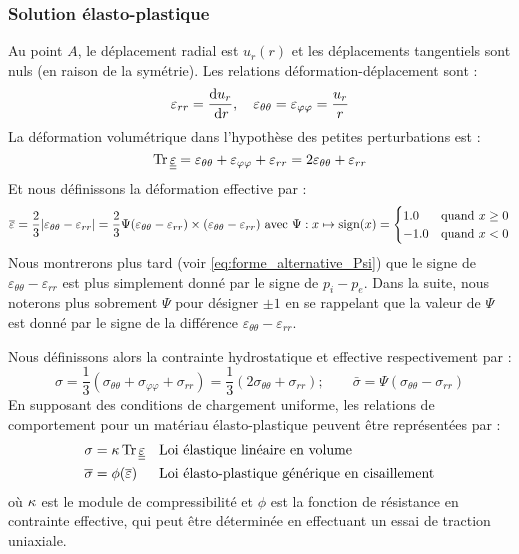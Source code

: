 \documentclass[10pt]{book}
\begin{document}
\subsubsection{Solution élasto-plastique}
Au point $A$, le déplacement radial est $u_{r}(r)$ et les déplacements tangentiels sont nuls (en raison de la symétrie). Les relations déformation-déplacement sont :
\begin{equation}
\varepsilon_{rr} = \frac{\mathrm{d} u_{r}}{\,\mathrm{d}r}, \quad \varepsilon_{\theta\theta} = \varepsilon_{\varphi\varphi} = \frac{u_{r}}{r}
\label{eq:Vaziri_defi_defo_sph}
\end{equation}
La déformation volumétrique dans l'hypothèse des petites perturbations est :
\begin{equation}
\tr\DefoHPP = \varepsilon_{\theta\theta} + \varepsilon_{\varphi\varphi} + \varepsilon_{rr} = 2\varepsilon_{\theta\theta} + \varepsilon_{rr}
\label{eq:Vaziri_defi_defo_vol}
\end{equation}
Et nous définissons la déformation effective par :
\begin{equation}
\overline{\varepsilon} = \frac{2}{3}|\varepsilon_{\theta\theta} - \varepsilon_{rr}| = \frac{2}{3}\Psi(\varepsilon_{\theta\theta} - \varepsilon_{rr}) \times (\varepsilon_{\theta\theta} - \varepsilon_{rr}) \text{ avec } \Psi:x\mapsto\mbox{sign}(x)= \begin{cases}
1.0 & \text{quand } x \geq 0\\
-1.0 & \text{quand } x < 0
\end{cases}
\label{eq:Vaziri_defi_defo_eff}
\end{equation}
Nous montrerons plus tard  (voir \eqref{eq:forme_alternative_Psi}) que le signe de $\varepsilon_{\theta\theta} - \varepsilon_{rr}$ est plus simplement donné par le signe de $p_{i}-p_{e}$. Dans la suite, nous noterons plus sobrement $\Psi$ pour désigner $\pm 1$ en se rappelant que la valeur de $\Psi$ est donné par le signe de la différence $\varepsilon_{\theta\theta} - \varepsilon_{rr}$.

Nous définissons alors la contrainte hydrostatique et effective respectivement par :
\begin{equation}
\sigma = \frac{1}{3}(\sigma_{\theta\theta} + \sigma_{\varphi\varphi} + \sigma_{rr}) = \frac{1}{3}(2\sigma_{\theta\theta} + \sigma_{rr}); \qquad 
\bar{\sigma} = \Psi(\sigma_{\theta\theta} - \sigma_{rr})
\label{eq:Vaziri_defi_sig_eff}
\end{equation}
En supposant des conditions de chargement uniforme, les relations de comportement pour un matériau élasto-plastique peuvent être représentées par :
\begin{align}\label{eq:Vaziri_loi_compo_sig}
\sigma &= \BulkModulus\tr\DefoHPP && \text{Loi élastique linéaire en volume}\\\label{eq:Vaziri_loi_compo_sig_eff}
\bar{\sigma} &= \phi(\bar{\varepsilon})&& \text{Loi élasto-plastique générique en cisaillement}
\end{align}
où $\kappa$ est le module de compressibilité et $\phi$ est la fonction de résistance en contrainte effective, qui peut être déterminée en effectuant un essai de traction uniaxiale.
\end{document}
